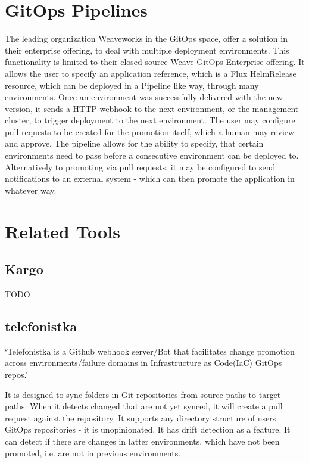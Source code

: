 \section{GitOps Pipelines}

The leading organization Weaveworks in the GitOps space,
offer a solution in their enterprise offering,
to deal with multiple deployment environments.
This functionality is limited to their closed-source Weave GitOps Enterprise offering.
It allows the user to specify an application reference,
which is a Flux HelmRelease resource,
which can be deployed in a Pipeline like way,
through many environments.
Once an environment was successfully delivered with the new version,
it sends a HTTP webhook to the next environment, or the management cluster,
to trigger deployment to the next environment.
The user may configure pull requests to be created for the promotion itself,
which a human may review and approve.
The pipeline allows for the ability to specify, that certain environments need
to pass before a consecutive environment can be deployed to.
Alternatively to promoting via pull requests,
it may be configured to send notifications
to an external system -
which can then promote the application in whatever way.

\section{Related Tools}

\subsection*{Kargo}

TODO

\subsection*{telefonistka}

\enquote*{Telefonistka is a Github webhook server/Bot that facilitates change promotion across environments/failure domains in Infrastructure as Code(IaC) GitOps repos.}
\autocite{telefonistka}

It is designed to sync folders in Git repositories from source paths to target paths.
When it detects changed that are not yet synced,
it will create a pull request against the repository.
It supports any directory structure of users GitOps repositories -
it is unopinionated.
It has drift detection as a feature. It can detect if there are changes in
latter environments, which have not been promoted, i.e. are not in previous environments.

